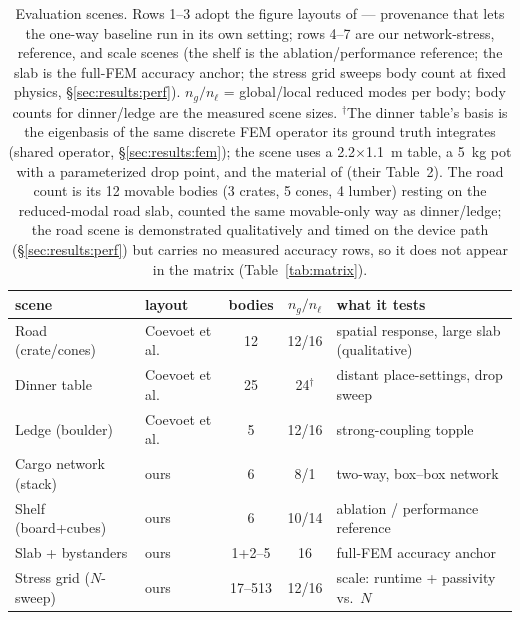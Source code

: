 \begin{table}[t]\centering\footnotesize
\setlength{\tabcolsep}{4pt}
\caption{Evaluation scenes. Rows 1--3 adopt the figure layouts of
\citet{coevoet2020distant} --- provenance that lets the one-way baseline run
in its own setting; rows 4--7 are our network-stress, reference, and scale scenes
(the shelf is the ablation/performance reference; the slab is the full-FEM
accuracy anchor; the stress grid sweeps body count at fixed physics,
\S\ref{sec:results:perf}).
$n_g/n_\ell$ = global/local reduced modes per body; body counts for dinner/ledge are
the measured scene sizes. $^{\dagger}$The dinner table's basis is the eigenbasis
of the same discrete FEM operator its ground truth integrates (shared operator,
\S\ref{sec:results:fem}); the scene uses a 2.2$\times$1.1~m table, a 5~kg pot
with a parameterized drop point, and the material of
\citet{coevoet2020distant} (their Table~2).
The road count is its 12 movable bodies (3 crates, 5 cones, 4 lumber) resting on
the reduced-modal road slab, counted the same movable-only way as dinner/ledge;
the road scene is demonstrated qualitatively and timed on the device path
(\S\ref{sec:results:perf}) but carries no measured accuracy rows, so it does
not appear in the matrix (Table~\ref{tab:matrix}).}
\label{tab:scenes}
\begin{tabular}{llccl}
\toprule
scene & layout & bodies & $n_g/n_\ell$ & what it tests \\
\midrule
Road (crate/cones)    & Coevoet et al. & 12              & 12/16 & spatial response, large slab (qualitative) \\
Dinner table          & Coevoet et al. & 25        & 24$^{\dagger}$ & distant place-settings, drop sweep \\
Ledge (boulder)       & Coevoet et al. & 5               & 12/16 & strong-coupling topple \\
Cargo network (stack) & ours      & 6              & 8/1   & two-way, box--box network \\
Shelf (board+cubes)   & ours      & 6              & 10/14 & ablation / performance reference \\
Slab + bystanders     & ours      & 1+2--5         & 16    & full-FEM accuracy anchor \\
Stress grid ($N$-sweep) & ours    & 17--513        & 12/16 & scale: runtime + passivity vs.\ $N$ \\
\bottomrule
\end{tabular}
\end{table}

